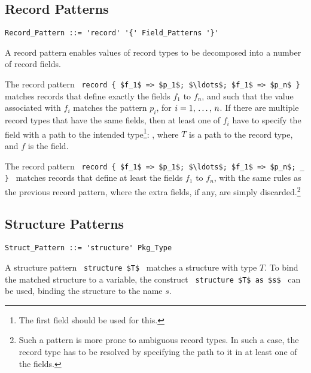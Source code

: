 \subsection{Record Patterns}
\label{sec:record-patterns}

\syntax\begin{lstlisting}
Record_Pattern ::= 'record' '{' Field_Patterns '}'
\end{lstlisting}

A record pattern enables values of record types to be decomposed into a number of record fields. 

The record pattern ~\lstinline!record { $f_1$ => $p_1$; $\ldots$; $f_1$ => $p_n$ }!~ matches records that define exactly the fields $f_1$ to $f_n$, and such that the value associated with $f_i$ matches the pattern $p_i$, for $i = 1 ,\, \ldots ,\, n$. If there are multiple record types that have the same fields, then at least one of $f_i$ have to specify the field with a path to the intended type\footnote{The first field should be used for this.}: , where $T$ is a path to the record type, and $f$ is the field. 

The record pattern ~\lstinline!record { $f_1$ => $p_1$; $\ldots$; $f_1$ => $p_n$; _ }!~ matches records that define at least the fields $f_1$ to $f_n$, with the same rules as the previous record pattern, where the extra fields, if any, are simply discarded.\footnote{Such a pattern is more prone to ambiguous record types. In such a case, the record type has to be resolved by specifying the path to it in at least one of the fields.}





\subsection{Structure Patterns}
\label{sec:structure-patterns}

\syntax\begin{lstlisting}
Struct_Pattern ::= 'structure' Pkg_Type
\end{lstlisting}

A structure pattern ~\lstinline!structure $T$!~ matches a structure with type $T$. To bind the matched structure to a variable, the construct ~\lstinline!structure $T$ as $s$!~ can be used, binding the structure to the name $s$. 










